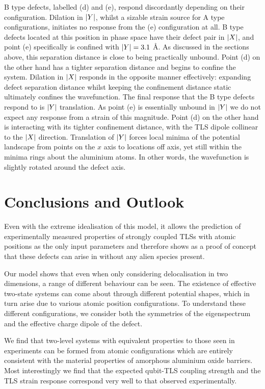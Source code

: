 B type defects, labelled (d) and (e), respond discordantly depending on their configuration.
Dilation in $\lvert Y\rvert$, whilst a sizable strain source for A type configurations, initiates no response from the (e) configuration at all.
B type defects located at this position in phase space have their defect pair in $\lvert X\rvert$, and point (e) specifically is confined with $\lvert Y\rvert = 3.1$ \AA.
As discussed in the sections above, this separation distance is close to being practically unbound.
Point (d) on the other hand has a tighter separation distance and begins to confine the system.
Dilation in $\lvert X\rvert$ responds in the opposite manner effectively: expanding defect separation distance whilst keeping the confinement distance static ultimately confines the wavefunction.
The final response that the B type defects respond to is $\lvert Y\rvert$ translation.
As point (e) is essentially unbound in $\lvert Y\rvert$ we do not expect any response from a strain of this magnitude.
Point (d) on the other hand is interacting with its tighter confinement distance, with the TLS dipole collinear to the $\lvert X\rvert$ direction.
Translation of $\lvert Y\rvert$ forces local minima of the potential landscape from points on the $x$ axis to locations off axis, yet still within the minima rings about the aluminium atoms.
In other words, the wavefunction is slightly rotated around the defect axis.

\section{Conclusions and Outlook}

Even with the extreme idealisation of this model, it allows the prediction of experimentally measured properties of strongly coupled TLSs with atomic positions as the only input parameters and therefore shows as a proof of concept that these defects can arise in  without any alien species present.

Our model shows that even when only considering delocalisation in two dimensions, a range of different behaviour can be seen.
The existence of effective two-state systems can come about through different potential shapes, which in turn arise due to various atomic position configurations.
To understand these different configurations, we consider both the symmetries of the eigenspectrum and the effective charge dipole of the defect.

We find that two-level systems with equivalent properties to those seen in experiments can be formed from atomic configurations which are entirely consistent with the material properties of amorphous aluminium oxide barriers.
Most interestingly we find that the expected qubit-TLS coupling strength and the TLS strain response correspond very well to that observed experimentally.

